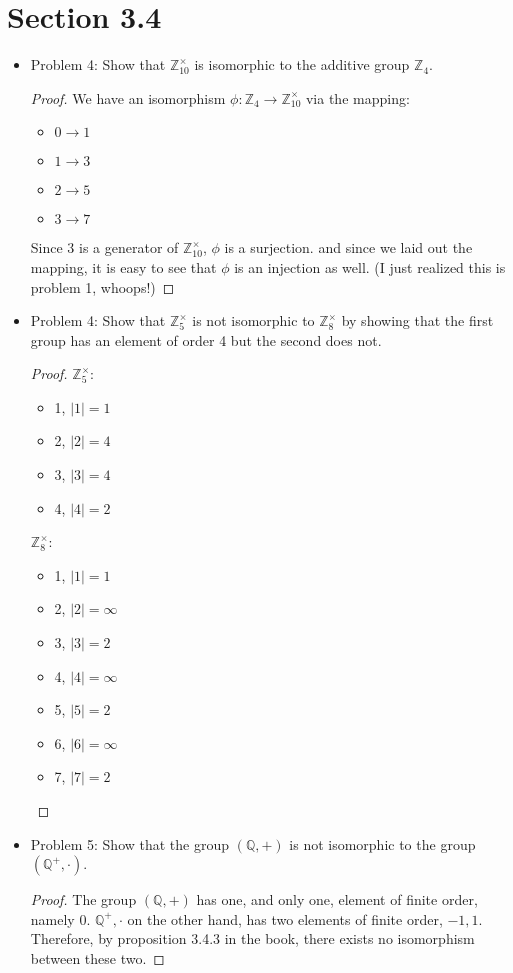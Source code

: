 \documentclass[hidelinks,12pt]{article}
\newcommand{\Z}{\mathbb{Z}}
\newcommand{\Q}{\mathbb{Q}}
\begin{document}
\section{Section 3.4}
\begin{itemize}
    \item Problem 4: Show that $\Z^{\times}_{10}$ is isomorphic to the additive group $\Z_4$.\begin{proof}We have an isomorphism $\phi:\Z_4\to\Z^{\times}_{10}$ via the mapping:\begin{itemize}[label=\textbullet]
        \item $0\to1$
        \item $1\to3$
        \item $2\to5$
        \item $3\to7$
    \end{itemize}
    Since $3$ is a generator of $\Z_{10}^{\times}$, $\phi$ is a surjection. and since we laid out the mapping, it is easy to see that $\phi$ is an injection as well. (I just realized this is problem 1, whoops!)
    \end{proof}
    \item Problem 4: Show that $\Z^{\times}_5$ is not isomorphic to $\Z^{\times}_8$ by showing that the first group has an element of order 4 but the second does not.\begin{proof}$\Z^{\times}_5$:\begin{itemize}[label=\textbullet]
        \item 1, $|1|=1$
        \item 2, $|2|=4$
        \item 3, $|3|=4$
        \item 4, $|4|=2$
    \end{itemize}$\Z^{\times}_8$:\begin{itemize}[label=\textbullet]
        \item 1, $|1|=1$
        \item 2, $|2|=\infty$
        \item 3, $|3|=2$
        \item 4, $|4|=\infty$
        \item 5, $|5|=2$
        \item 6, $|6|=\infty$
        \item 7, $|7|=2$
    \end{itemize}
    \end{proof}
    \item Problem 5: Show that the group $(\Q,+)$ is not isomorphic to the group $(\Q^+,\cdot)$.\begin{proof}The group $(\Q,+)$ has one, and only one, element of finite order, namely 0. $\Q^+,\cdot$ on the other hand, has two elements of finite order, $-1,1$. Therefore, by proposition 3.4.3 in the book, there exists no isomorphism between these two.

\end{proof}
\end{itemize}
\end{document}
